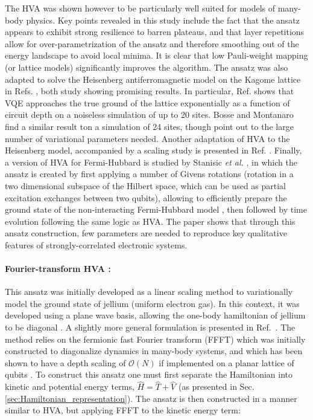 The HVA was shown however to be particularly well suited for models of many-body physics\cite{Wiersema2020}. Key points revealed in this study include the fact that the ansatz appears to exhibit strong resilience to barren plateaus, and that layer repetitions allow for over-parametrization of the ansatz and therefore smoothing out of the energy landscape to avoid local minima. It is clear that low Pauli-weight mapping (or lattice models) significantly improves the algorithm. The ansatz was also adapted to solve the Heisenberg antiferromagnetic model on the Kagome lattice in Refs. \cite{kattemolle2021variational, bosse2021probing}, both study showing promising results. In particular, Ref. \cite{kattemolle2021variational} shows that VQE approaches the true ground of the lattice exponentially as a function of circuit depth on a noiseless simulation of up to 20 sites. Bosse and Montanaro~\cite{bosse2021probing} find a similar result ton a simulation of 24 sites, though point out to the large number of variational parameters needed. Another adaptation of HVA to the Heisenberg model, accompanied by a scaling study is presented in Ref. \cite{Jattana2022}. Finally, a version of HVA for Fermi-Hubbard is studied by Stanisic \textit{et al.} \cite{Stanisic2021}, in which the ansatz is created by first applying a number of Givens rotations (rotation in a two dimensional subspace of the Hilbert space, which can be used as partial excitation exchanges between two qubits), allowing to efficiently prepare the ground state of the non-interacting Fermi-Hubbard model \cite{Jiang2018}, then followed by time evolution following the same logic as HVA. The paper shows that through this ansatz construction, few parameters are needed to reproduce key qualitative features of strongly-correlated electronic systems. 

\paragraph{Fourier-transform HVA \cite{Babbush2018}:} This ansatz was initially developed as a linear scaling method to variationally model the ground state of jellium (uniform electron gas). In this context, it was developed using a plane wave basis, allowing the one-body hamiltonian of jellium to be diagonal \cite{Babbush2018}. A slightly more general formulation is presented in Ref.~\cite{Choquette2021}. The method relies on the fermionic fast Fourier transform (FFFT) \cite{Verstraete2009, Ferris2014, Jiang2018} which was initially constructed to diagonalize dynamics in many-body systems, and which has been shown to have a depth scaling of $\mathcal{O}(N)$ if implemented on a planar lattice of qubits \cite{Babbush2018}. To construct this ansatz one must first separate the Hamiltonian into kinetic and potential energy terms, $\hat{H} = \hat{T} + \hat{V}$ (as presented in Sec. \ref{sec:Hamiltonian_representation}). The ansatz is then constructed in a manner similar to HVA, but applying FFFT to the kinetic energy term: 

